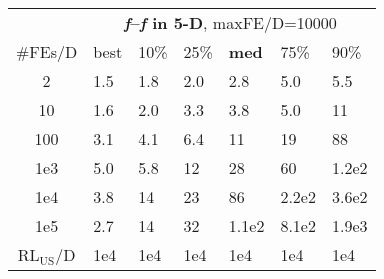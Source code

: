 \begin{tabular}{c|llllll}
 & \multicolumn{6}{|c}{\textbf{\textit{f}\raisebox{-0.35ex}{1}--\textit{f}\raisebox{-0.35ex}{24} in 5-D}, maxFE/D=10000}\\
\#FEs/D & best & 10\% & 25\% & \textbf{med} & 75\% & 90\%\\
2 & \hspace*{1ex}1.5 & \hspace*{1ex}1.8 & \hspace*{1ex}2.0 & \hspace*{1ex}2.8 & \hspace*{1ex}5.0 & \hspace*{1ex}5.5\\
10 & \hspace*{1ex}1.6 & \hspace*{1ex}2.0 & \hspace*{1ex}3.3 & \hspace*{1ex}3.8 & \hspace*{1ex}5.0 & 11\\
100 & \hspace*{1ex}3.1 & \hspace*{1ex}4.1 & \hspace*{1ex}6.4 & 11 & 19 & 88\\
1e3 & \hspace*{1ex}5.0 & \hspace*{1ex}5.8 & 12 & 28 & 60 & 1.2e2\\
1e4 & \hspace*{1ex}3.8 & 14 & 23 & 86 & 2.2e2 & 3.6e2\\
1e5 & \hspace*{1ex}2.7 & 14 & 32 & 1.1e2 & 8.1e2 & 1.9e3\\
$\text{RL}_{\text{US}}$/D & 1e4 & 1e4 & 1e4 & 1e4 & 1e4 & 1e4
\end{tabular}
